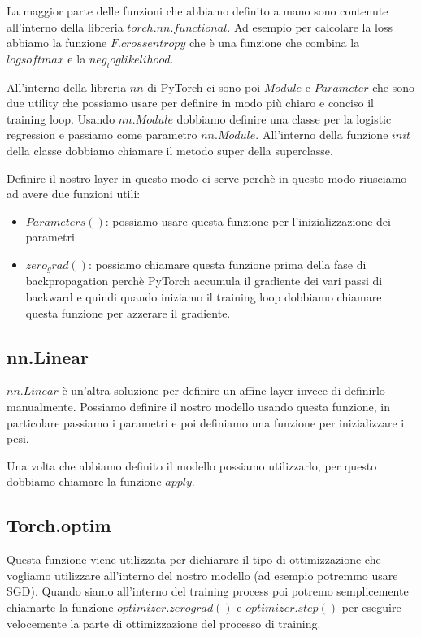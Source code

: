 \documentclass[14pt]{extreport}
\begin{document}
La maggior parte delle funzioni che abbiamo definito a mano sono contenute all'interno della libreria $torch.nn.functional$. Ad esempio per calcolare
la loss abbiamo la funzione $F.crossentropy$ che è una funzione che combina la $logsoftmax$ e la $neg_loglikelihood$.

All'interno della libreria $nn$ di PyTorch ci sono poi $Module$ e $Parameter$ che sono due utility che possiamo usare per definire in modo più chiaro
e conciso il training loop. Usando $nn.Module$ dobbiamo definire una classe per la logistic regression e passiamo come parametro $nn.Module$.
All'interno della funzione $init$ della classe dobbiamo chiamare il metodo super della superclasse.

Definire il nostro layer in questo modo ci serve perchè in questo modo riusciamo ad avere due funzioni utili:

\begin{itemize}
	\item $Parameters()$: possiamo usare questa funzione per l'inizializzazione dei parametri
	\item $zero_grad()$: possiamo chiamare questa funzione prima della fase di backpropagation perchè PyTorch accumula il gradiente dei vari passi di
	      backward e quindi quando iniziamo il training loop dobbiamo chiamare questa funzione per azzerare il gradiente.
\end{itemize}

\subsection{nn.Linear}

$nn.Linear$ è un'altra soluzione per definire un affine layer invece di definirlo manualmente. Possiamo definire il nostro modello usando questa
funzione, in particolare passiamo i parametri e poi definiamo una funzione per inizializzare i pesi.

Una volta che abbiamo definito il modello possiamo utilizzarlo, per questo dobbiamo chiamare la funzione $apply$.

\subsection{Torch.optim}

Questa funzione viene utilizzata per dichiarare il tipo di ottimizzazione che vogliamo utilizzare all'interno del nostro modello (ad esempio potremmo
usare SGD). Quando siamo all'interno del training process poi potremo semplicemente chiamarte la funzione $optimizer.zero grad()$ e $optimizer.step()$
per eseguire velocemente la parte di ottimizzazione del processo di training.
\end{document}
